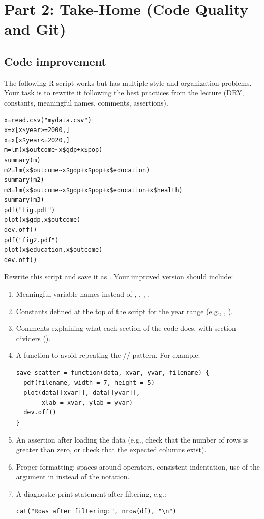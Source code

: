 \newpage

\section{Part 2: Take-Home (Code Quality and Git)}

\subsection{Code improvement}

The following R script works but has multiple style and organization problems. Your task is to rewrite it following the best practices from the lecture (DRY, constants, meaningful names, comments, assertions).

\begin{lstlisting}
x=read.csv("mydata.csv")
x=x[x$year>=2000,]
x=x[x$year<=2020,]
m=lm(x$outcome~x$gdp+x$pop)
summary(m)
m2=lm(x$outcome~x$gdp+x$pop+x$education)
summary(m2)
m3=lm(x$outcome~x$gdp+x$pop+x$education+x$health)
summary(m3)
pdf("fig.pdf")
plot(x$gdp,x$outcome)
dev.off()
pdf("fig2.pdf")
plot(x$education,x$outcome)
dev.off()
\end{lstlisting}

Rewrite this script and save it as . Your improved version should include:

\begin{enumerate}[label=\alph*)]
  \item Meaningful variable names instead of , , , .
  \item Constants defined at the top of the script for the year range (e.g., , ).
  \item Comments explaining what each section of the code does, with section dividers (\code{\# ============}).
  \item A function to avoid repeating the // pattern. For example:
  \begin{lstlisting}
save_scatter = function(data, xvar, yvar, filename) {
  pdf(filename, width = 7, height = 5)
  plot(data[[xvar]], data[[yvar]],
       xlab = xvar, ylab = yvar)
  dev.off()
}
  \end{lstlisting}
  \item An assertion after loading the data (e.g., check that the number of rows is greater than zero, or check that the expected columns exist).
  \item Proper formatting: spaces around operators, consistent indentation, use of the  argument in  instead of the \code{\$} notation.
  \item A diagnostic print statement after filtering, e.g.:
  \begin{lstlisting}
cat("Rows after filtering:", nrow(df), "\n")
  \end{lstlisting}
\end{enumerate}

